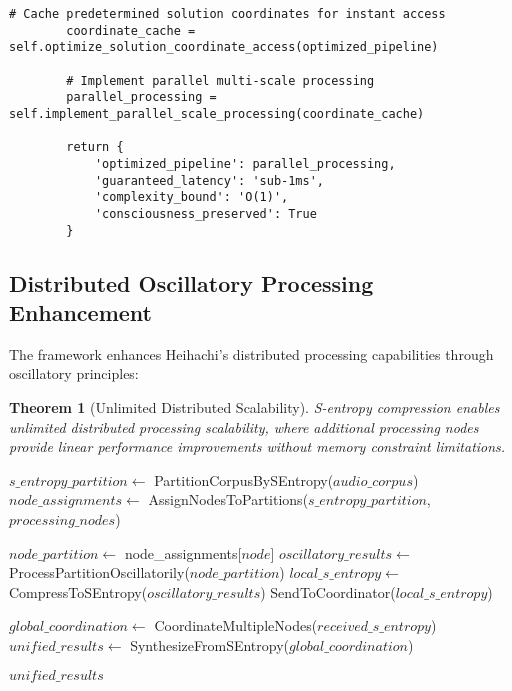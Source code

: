 \documentclass[12pt,a4paper]{article}
\newtheorem{theorem}{Theorem}
\begin{document}
\begin{lstlisting}[style=pythonstyle, caption=O(1) Real-Time Audio Intelligence Implementation]
        # Cache predetermined solution coordinates for instant access
        coordinate_cache = self.optimize_solution_coordinate_access(optimized_pipeline)
        
        # Implement parallel multi-scale processing
        parallel_processing = self.implement_parallel_scale_processing(coordinate_cache)
        
        return {
            'optimized_pipeline': parallel_processing,
            'guaranteed_latency': 'sub-1ms',
            'complexity_bound': 'O(1)',
            'consciousness_preserved': True
        }
\end{lstlisting}

\subsection{Distributed Oscillatory Processing Enhancement}

The framework enhances Heihachi's distributed processing capabilities through oscillatory principles:

\begin{theorem}[Unlimited Distributed Scalability]
S-entropy compression enables unlimited distributed processing scalability, where additional processing nodes provide linear performance improvements without memory constraint limitations.
\end{theorem}

\begin{algorithm}
\caption{Distributed Oscillatory Audio Processing}
\begin{algorithmic}[1]
    \State $s\_entropy\_partition \gets$ PartitionCorpusBySEntropy($audio\_corpus$)
    \State $node\_assignments \gets$ AssignNodesToPartitions($s\_entropy\_partition$, $processing\_nodes$)
    
        \State $node\_partition \gets$ node\_assignments[$node$]
        \State $oscillatory\_results \gets$ ProcessPartitionOscillatorily($node\_partition$)
        \State $local\_s\_entropy \gets$ CompressToSEntropy($oscillatory\_results$)
        \State SendToCoordinator($local\_s\_entropy$)
    \EndFor
    
    \State $global\_coordination \gets$ CoordinateMultipleNodes($received\_s\_entropy$)
    \State $unified\_results \gets$ SynthesizeFromSEntropy($global\_coordination$)
    
    \State \Return $unified\_results$
\EndProcedure
\end{algorithmic}
\end{algorithm}
\end{document}
